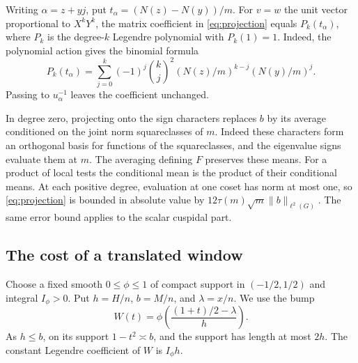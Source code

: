 Writing \(\alpha=z+yj\), put \(t_\alpha=(N(z)-N(y))/m\).
For \(v=w\) the unit vector proportional to \(X^kY^k\), the
matrix coefficient in \eqref{eq:projection} equals \(P_k(t_\alpha)\),
where \(P_k\) is the degree-\(k\) Legendre polynomial with \(P_k(1)=1\).
Indeed, the polynomial action gives the binomial formula
\[
 P_k(t_\alpha)=\sum_{j=0}^k(-1)^j\binom{k}{j}^2
               (N(z)/m)^{k-j}(N(y)/m)^j.
\]
Passing to \(u_\alpha^{-1}\) leaves the coefficient unchanged.

In degree zero, projecting onto the sign characters replaces \(b\)
by its average conditioned on the joint norm squareclasses of
\(m\). Indeed these characters form an orthogonal basis for
functions of the squareclasses, and the eigenvalue signs evaluate
them at \(m\). The averaging defining \(F\) preserves these means.
For a product of local tests the conditional mean is the product
of their conditional means. At each positive degree, evaluation
at one coset has norm at most one, so \eqref{eq:projection} is
bounded in absolute value by \(12\tau(m)\sqrt m\|b\|_{\ell^2(G)}\).
The same error bound applies to the scalar cuspidal part.

\subsection{The cost of a translated window}
Choose a fixed smooth \(0\le\phi\le1\) of compact support in
\((-1/2,1/2)\) and integral \(I_\phi>0\). Put \(h=H/n\),
\(b=M/n\), and \(\lambda=x/n\). We use the bump
\[
 W(t)=\phi\!\left(\frac{(1+t)/2-\lambda}{h}\right).
\]
As \(h\le b\), on its support \(1-t^2\asymp b\), and the
support has length at most \(2h\). The constant Legendre
coefficient of \(W\) is \(I_\phi h\).

